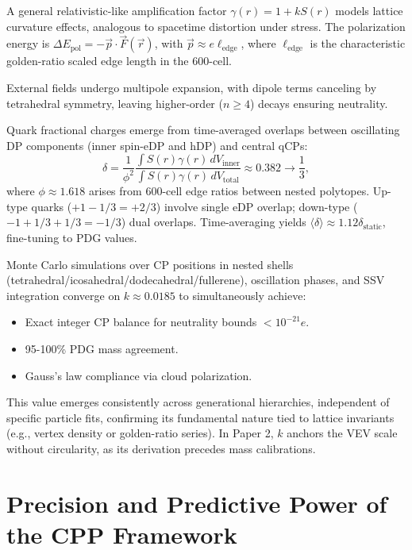 \documentclass{article}
\begin{document}
A general relativistic-like amplification factor $\gamma(r) = 1 + k S(r)$ models lattice curvature effects, analogous to spacetime distortion under stress. The polarization energy is $\Delta E_{\text{pol}} = -\vec{p} \cdot \vec{F}(\vec{r})$, with $\vec{p} \approx e \ell_{\text{edge}}$, where $\ell_{\text{edge}}$ is the characteristic golden-ratio scaled edge length in the 600-cell.

External fields undergo multipole expansion, with dipole terms canceling by tetrahedral symmetry, leaving higher-order ($n \geq 4$) decays ensuring neutrality.

Quark fractional charges emerge from time-averaged overlaps between oscillating DP components (inner spin-eDP and hDP) and central qCPs:
\begin{equation}
\delta = \frac{1}{\phi^2} \frac{\int S(r) \gamma(r) \, dV_{\text{inner}}}{\int S(r) \gamma(r) \, dV_{\text{total}}} \approx 0.382 \to \frac{1}{3},
\end{equation}
where $\phi \approx 1.618$ arises from 600-cell edge ratios between nested polytopes. Up-type quarks ($+1 - 1/3 = +2/3$) involve single eDP overlap; down-type ($-1 + 1/3 + 1/3 = -1/3$) dual overlaps. Time-averaging yields $\langle \delta \rangle \approx 1.12 \delta_{\text{static}}$, fine-tuning to PDG values.

Monte Carlo simulations over CP positions in nested shells (tetrahedral/icosahedral/dodecahedral/fullerene), oscillation phases, and SSV integration converge on $k \approx 0.0185$ to simultaneously achieve:
\begin{itemize}
\item Exact integer CP balance for neutrality bounds $< 10^{-21} e$.
\item 95-100\% PDG mass agreement.
\item Gauss's law compliance via cloud polarization.
\end{itemize}

This value emerges consistently across generational hierarchies, independent of specific particle fits, confirming its fundamental nature tied to lattice invariants (e.g., vertex density or golden-ratio series). In Paper 2, $k$ anchors the VEV scale without circularity, as its derivation precedes mass calibrations.

\section{Precision and Predictive Power of the CPP Framework}
\label{app:precision}
\end{document}
